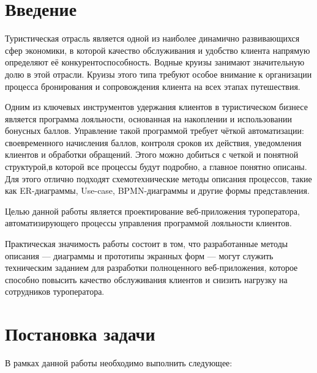 \documentclass[11pt,a4paper,final]{article}
\begin{document}
	
	\newpage
	 
	\clearpage
	
	\newpage
	\tableofcontents
	
	
	\newpage
	\section*{Введение}
	
	Туристическая отрасль является одной из наиболее динамично развивающихся сфер
	экономики, в которой качество обслуживания и удобство клиента напрямую определяют её конкурентоспособность. Водные круизы
	занимают значительную долю в этой отрасли. Круизы этого типа требуют особое внимание к организации процесса бронирования и сопровождения
	клиента на всех этапах путешествия.
	
	Одним из ключевых инструментов удержания клиентов в туристическом бизнесе
	является программа лояльности, основанная на накоплении и использовании
	бонусных баллов. Управление такой программой требует чёткой
	автоматизации: своевременного начисления баллов, контроля сроков их действия,
	уведомления клиентов и обработки обращений. Этого можно добиться с четкой и понятной структурой,в которой все процессы будут подробно, а главное понятно описаны. Для этого отлично подходят схемотехнические методы описания процессов, такие как ER-диаграммы, Use-case, BPMN-диаграммы и другие формы представления.  
	
	Целью данной работы является проектирование веб-приложения туроператора,
	автоматизирующего процессы управления программой
	лояльности клиентов. 
	
	Практическая значимость работы состоит в том, что разработанные методы описания — диаграммы и прототипы экранных форм — могут
	служить техническим заданием для разработки полноценного
	веб-приложения, которое способно повысить качество обслуживания клиентов и снизить нагрузку на сотрудников туроператора.
	
	\newpage
	\section{Постановка задачи}
	
	В рамках данной работы необходимо выполнить следующее:
	
\end{document}
